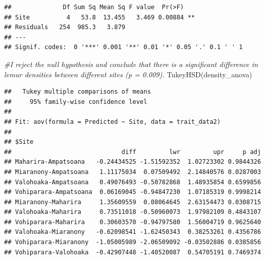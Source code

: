 \documentclass[
  12pt,
]{article}
\newenvironment{Shaded}{\begin{snugshade}}{\end{snugshade}}
\newcommand{\CommentTok}[1]{\textcolor[rgb]{0.56,0.35,0.01}{\textit{#1}}}
\newcommand{\FunctionTok}[1]{\textcolor[rgb]{0.00,0.00,0.00}{#1}}
\newcommand{\NormalTok}[1]{#1}
\begin{document}
\begin{verbatim}
##              Df Sum Sq Mean Sq F value  Pr(>F)   
## Site          4   53.8  13.455   3.469 0.00884 **
## Residuals   254  985.3   3.879                   
## ---
## Signif. codes:  0 '***' 0.001 '**' 0.01 '*' 0.05 '.' 0.1 ' ' 1
\end{verbatim}

\begin{Shaded}
\begin{Highlighting}[]
\CommentTok{\#I reject the null hypothesis and conclude that there is a significant difference in lemur densities between different sites (p = 0.009). }
\FunctionTok{TukeyHSD}\NormalTok{(density\_anova)}
\end{Highlighting}
\end{Shaded}

\begin{verbatim}
##   Tukey multiple comparisons of means
##     95% family-wise confidence level
## 
## Fit: aov(formula = Predicted ~ Site, data = trait_data2)
## 
## $Site
##                              diff         lwr         upr     p adj
## Maharira-Ampatsoana   -0.24434525 -1.51592352  1.02723302 0.9844326
## Miaranony-Ampatsoana   1.11175034  0.07509492  2.14840576 0.0287003
## Valohoaka-Ampatsoana   0.49076493 -0.50782868  1.48935854 0.6599856
## Vohiparara-Ampatsoana  0.06169045 -0.94847230  1.07185319 0.9998214
## Miaranony-Maharira     1.35609559  0.08064645  2.63154473 0.0308715
## Valohoaka-Maharira     0.73511018 -0.50960073  1.97982109 0.4843107
## Vohiparara-Maharira    0.30603570 -0.94797580  1.56004719 0.9625640
## Valohoaka-Miaranony   -0.62098541 -1.62450343  0.38253261 0.4356786
## Vohiparara-Miaranony  -1.05005989 -2.06509092 -0.03502886 0.0385856
## Vohiparara-Valohoaka  -0.42907448 -1.40520087  0.54705191 0.7469374
\end{verbatim}
\end{document}

